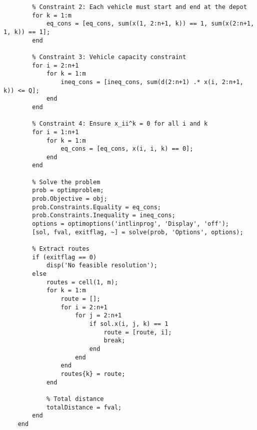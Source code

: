 \begin{lstlisting}
        % Constraint 2: Each vehicle must start and end at the depot
        for k = 1:m
            eq_cons = [eq_cons, sum(x(1, 2:n+1, k)) == 1, sum(x(2:n+1, 1, k)) == 1];
        end
            
        % Constraint 3: Vehicle capacity constraint
        for i = 2:n+1
            for k = 1:m
                ineq_cons = [ineq_cons, sum(d(2:n+1) .* x(i, 2:n+1, k)) <= Q];
            end
        end
        
        % Constraint 4: Ensure x_ii^k = 0 for all i and k
        for i = 1:n+1
            for k = 1:m
                eq_cons = [eq_cons, x(i, i, k) == 0];
            end
        end

        % Solve the problem
        prob = optimproblem;
        prob.Objective = obj;
        prob.Constraints.Equality = eq_cons;
        prob.Constraints.Inequality = ineq_cons;
        options = optimoptions('intlinprog', 'Display', 'off');
        [sol, fval, exitflag, ~] = solve(prob, 'Options', options);
            
        % Extract routes
        if (exitflag == 0)
            disp('No feasible resolution');
        else
            routes = cell(1, m);
            for k = 1:m
                route = [];
                for i = 2:n+1
                    for j = 2:n+1
                        if sol.x(i, j, k) == 1
                            route = [route, i];
                            break;
                        end
                    end
                end
                routes{k} = route;
            end
                
            % Total distance
            totalDistance = fval;
        end
    end
    \end{lstlisting}

